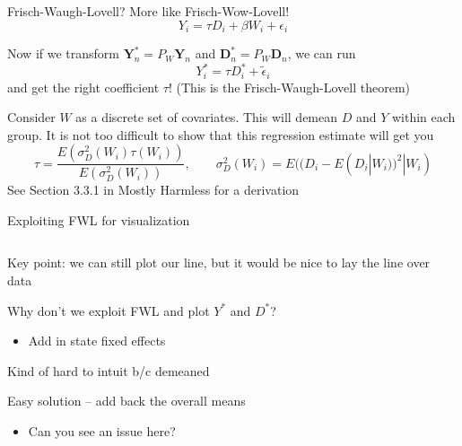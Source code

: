 \documentclass[notes,11pt, aspectratio=169]{beamer}
\newenvironment{wideitemize}{\itemize\addtolength{\itemsep}{10pt}}{\enditemize}
\begin{document}
\begin{frame}{Frisch-Waugh-Lovell? More like Frisch-Wow-Lovell!}
  $$ Y_{i} = \tau D_{i} + \beta W_{i} + \epsilon_{i}$$
  \begin{wideitemize}
  \item Now if we transform $\mathbf{Y}_{n}^{*} = P_{W}\mathbf{Y}_{n}$ and $\mathbf{D}_{n}^{*} = P_{W}\mathbf{D}_{n}$, we can run
    $$ Y_{i}^{*} = \tau D^{*}_{i} +  \tilde{\epsilon}_{i}$$
    and get the right coefficient $\tau$! (This is the Frisch-Waugh-Lovell theorem)
  \item Consider $W$ as a discrete set of covariates. This will
    demean $D$ and $Y$ within each group. It is not too difficult to
    show that this regression estimate will get you
    \begin{equation}
      \tau = \frac{E(\sigma^{2}_{D}(W_{i})\tau(W_{i}))}{E(\sigma^{2}_{D}(W_{i}))}, \qquad \sigma^{2}_{D}(W_{i}) = E((D_{i} - E(D_{i}|W_{i}))^{2} | W_{i})
    \end{equation}
    See Section 3.3.1 in Mostly Harmless for a derivation
  \end{wideitemize}
\end{frame}


\begin{frame}{Exploiting FWL for visualization}
  \begin{columns}[T] %
    \begin{column}{.5\textwidth}
  \begin{wideitemize}
  \item<1-> Key point: we can still plot our line, but it would be nice to
    lay the line over data
  \item<1-> Why don't we exploit FWL and plot $Y^{*}$ and  $D^{*}$?
    \begin{itemize}
    \item Add in state fixed effects
    \end{itemize}
  \item<1-> Kind of hard to intuit b/c demeaned
  \item<2-> Easy solution -- add back the overall means
    \begin{itemize}
    \item Can you see an issue here?
    \end{itemize}
  \end{wideitemize}
  \end{column}%
  \hfill%
  \begin{column}{.5\textwidth}
  \end{column}
\end{columns}
\end{frame}
\end{document}
